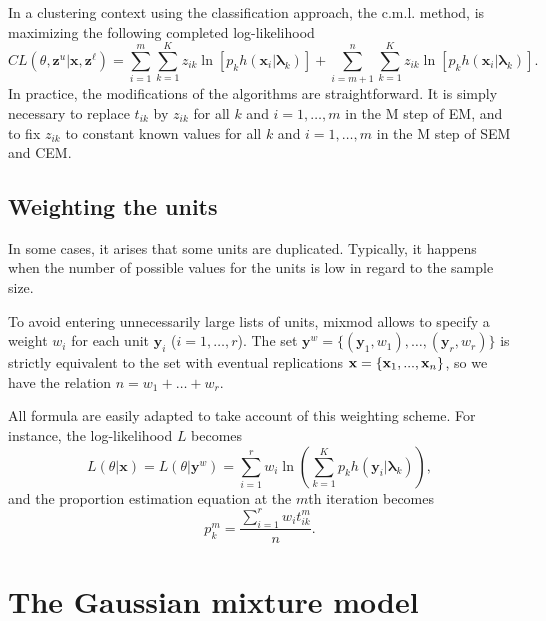 \documentclass[12pt]{article}
\newcommand{\bx}{\mathbf{x}}
\newcommand{\bz}{\mathbf{z}}
\newcommand{\by}{\mathbf{y}}
\newcommand{\blambda}{\boldsymbol{\lambda}}
\begin{document}
In a clustering context using the classification approach, the c.m.l. method, is maximizing the
following completed log-likelihood
\begin{equation}
  CL(\theta, \bz^u | \bx,\bz^\ell) = \sum_{i=1}^m\sum_{k=1}^{K}z_{ik}
  \ln[p_k h(\bx_i|\blambda_k)] + \sum_{i=m+1}^n\sum_{k=1}^{K}z_{ik}
  \ln[p_k h(\bx_i|\blambda_k)].
\end{equation}
In practice, the modifications of the algorithms are straightforward. It is simply necessary
to replace $t_{ik}$ by $z_{ik}$ for all $k$ and $i=1,\ldots,m$ in the M step of EM, and to fix
$z_{ik}$ to constant known values for all $k$ and $i=1,\ldots,m$ in the M step of SEM and CEM.

\subsection{Weighting the units}
In some cases, it arises that some units are duplicated. Typically, it happens when the number
of possible values for the units is low in regard to the sample size.

To avoid entering unnecessarily large lists of units, {\sc mixmod} allows to specify a weight
$w_i$ for each unit $\by_i$ ($i=1,\ldots,r$). The set \linebreak $\by^w = \{ (\by_1,w_1),
\ldots, (\by_r,w_r) \}$ is strictly equivalent to the set with eventual replications ${\bf
  x}=\{ {\bf x}_1,...,{\bf x}_n\}$, so we have the relation $n=w_1+\ldots+w_r$.

All formula are easily adapted to take account of this weighting scheme. For instance, the
log-likelihood $L$ becomes
\begin{equation}
  L(\theta | \bx) = L(\theta | \by^w) = \sum_{i=1}^{r} w_i \ln
  \left( \sum_{k=1}^K p_k h(\by_i|\blambda_k) \right),
\end{equation}
and the proportion estimation equation at the $m$th iteration becomes
\begin{equation}
  p_k^m = \frac{\sum_{i=1}^r w_i t_{ik}^m}{n}.
\end{equation}

\section{The Gaussian mixture model}
\end{document}

